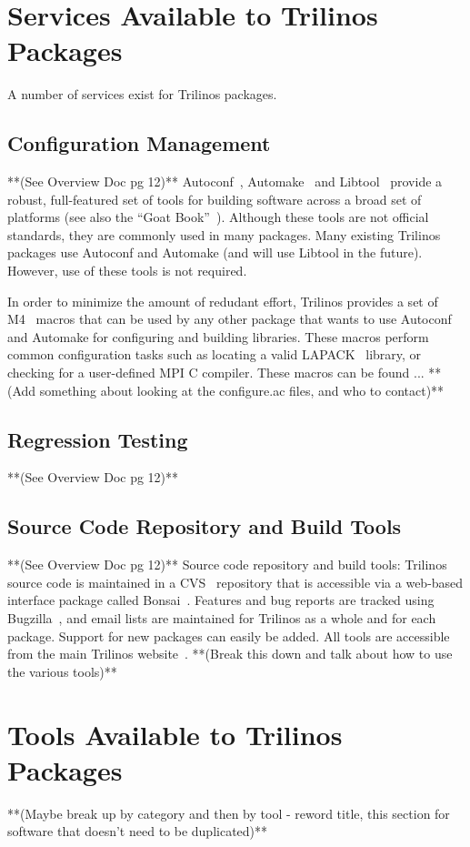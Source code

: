 \documentclass[12pt]{report}
\begin{document}
	\chapter{Services Available to Trilinos Packages}
	A number of services exist for Trilinos packages.
	\section{Configuration Management}
	**(See Overview Doc pg 12)**
Autoconf~\cite{Autoconf},  Automake~\cite{Automake} and
Libtool~\cite{Libtool} provide a robust, full-featured set of tools for
building software across a broad set of platforms (see also the ``Goat
Book''~\cite{GoatBook}).  Although these
tools are not official standards, they are commonly used in many
packages.  Many existing
Trilinos packages use Autoconf and Automake (and will use
Libtool in the future).  However, use of these tools is not required.

In order to minimize the amount of redudant effort, Trilinos provides a set of
M4~\cite{M4} macros that can be used by any other
package that wants to use Autoconf and Automake for configuring and
building libraries.  These macros perform common configuration tasks such as
locating a valid LAPACK~\cite{lapack} library, or checking for a user-defined 
MPI C compiler.  These macros can be found ...
**(Add something about looking at the configure.ac files, and who to contact)**

	\section{Regression Testing}
	**(See Overview Doc pg 12)**
	
	\section{Source Code Repository and Build Tools}
	**(See Overview Doc pg 12)**
Source code repository and build tools: Trilinos source code is
maintained in a CVS~\cite{CVS} repository that is accessible via a
web-based interface package called Bonsai~\cite{Bonsai}.  Features and bug reports
are tracked using Bugzilla~\cite{Bugzilla}, and email lists are
maintained for Trilinos as a whole and for each package.  Support for new
packages can easily be added.  All tools are accessible from the main
Trilinos website~\cite{Trilinos-home-page}.
**(Break this down and talk about how to use the various tools)**

	\chapter{Tools Available to Trilinos Packages}
	**(Maybe break up by category and then by tool - reword title, this section for software that doesn't need to be duplicated)**
\end{document}
